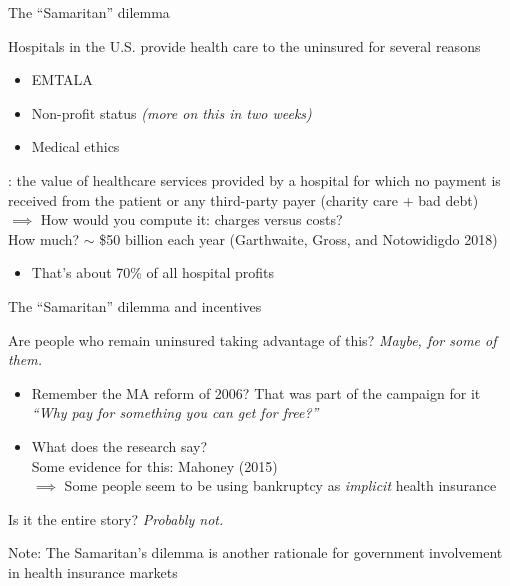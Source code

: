 \begin{frame}{The ``Samaritan'' dilemma}

    Hospitals in the U.S. provide health care to the uninsured for several reasons
    \begin{itemize}
        \item EMTALA
        \item Non-profit status \textit{(more on this in two weeks)}
        \item Medical ethics
    \end{itemize}
    \vspace{5mm}

    : the value of healthcare services provided by a hospital for which no payment is received from the patient or any third-party payer (charity care + bad debt)\\
    $\implies$ How would you compute it: charges versus costs?\\
    \pause
    \vspace{5mm}
    How much? $\sim$ \$50 billion each year (Garthwaite, Gross, and Notowidigdo 2018)
    \begin{itemize}
        \item That's about 70\% of all hospital profits
    \end{itemize}

\end{frame}
\begin{frame}{The ``Samaritan'' dilemma and incentives}

    Are people who remain uninsured taking advantage of this? \textit{Maybe, for some of them.}
    \begin{itemize}
        \item Remember the MA reform of 2006? That was part of the campaign for it\\
        \textit{``Why pay for something you can get for free?''}
        \item What does the research say?\\
        Some evidence for this: Mahoney (2015)\\
        $\implies$ Some people seem to be using bankruptcy as \textit{implicit} health insurance
    \end{itemize}
    \vspace{5mm}

    Is it the entire story? \textit{Probably not.}\\
    \vspace{5mm}

    Note: The Samaritan's dilemma is another rationale for government involvement in health insurance markets

\end{frame}

